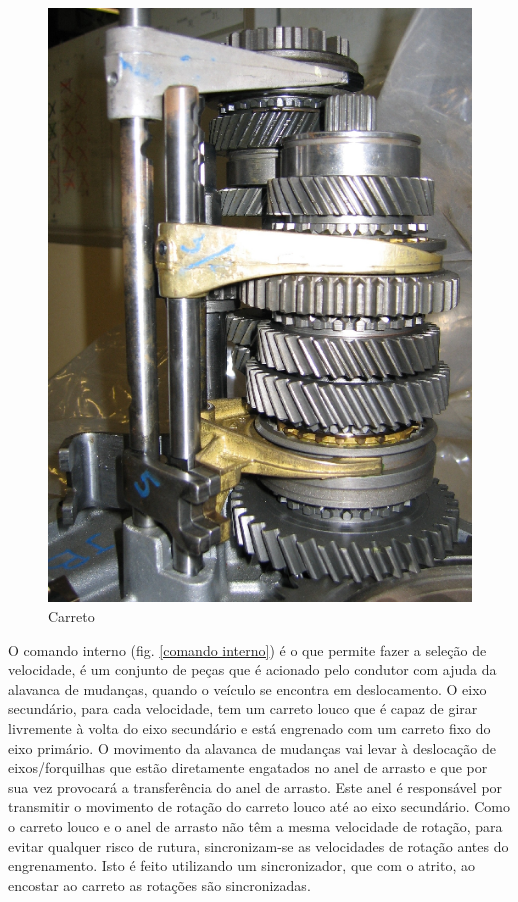 \begin{figure}[H]
\centering
\includegraphics[scale=1.0]{figs/carretos}
\caption{Carreto}\label{carreto}
\end{figure}

O comando interno (fig. \ref{comando interno}) é o que permite fazer a seleção de velocidade, é um conjunto de peças que é acionado pelo condutor com ajuda da alavanca de mudanças, quando o veículo se encontra em deslocamento. O eixo secundário, para cada velocidade, tem um carreto louco que é capaz de girar livremente à volta do eixo secundário e está engrenado com um carreto fixo do eixo primário. O movimento da alavanca de mudanças vai levar à deslocação de eixos/forquilhas que estão diretamente engatados no anel de arrasto e que por sua vez provocará a transferência do anel de arrasto. Este anel é responsável por transmitir o movimento de rotação do carreto louco até ao eixo secundário. Como o carreto louco e o anel de arrasto não têm a mesma velocidade de rotação, para evitar qualquer risco de rutura, sincronizam-se as velocidades de rotação antes do engrenamento. Isto é feito utilizando um sincronizador, que com o atrito, ao encostar ao carreto as rotações são sincronizadas.

